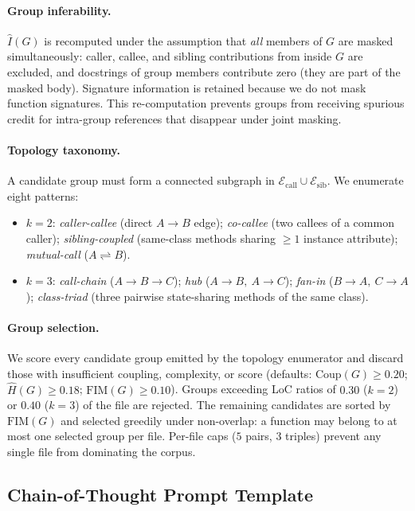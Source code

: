 \paragraph{Group inferability.}
$\hat{I}(G)$ is recomputed under the assumption that \emph{all} members of
$G$ are masked simultaneously: caller, callee, and sibling contributions
from inside $G$ are excluded, and docstrings of group members contribute
zero (they are part of the masked body). Signature information is retained
because we do not mask function signatures. This re-computation prevents
groups from receiving spurious credit for intra-group references that
disappear under joint masking.

\paragraph{Topology taxonomy.}
A candidate group must form a connected subgraph in
$\mathcal{E}_{\mathrm{call}} \cup \mathcal{E}_{\mathrm{sib}}$. We
enumerate eight patterns:
%
\begin{itemize}\setlength\itemsep{0.1em}
  \item \emph{$k=2$}: \emph{caller-callee} (direct $A\!\to\!B$ edge);
  \emph{co-callee} (two callees of a common caller); \emph{sibling-coupled}
  (same-class methods sharing $\geq 1$ instance attribute);
  \emph{mutual-call} ($A\!\rightleftharpoons\!B$).
  \item \emph{$k=3$}: \emph{call-chain} ($A\!\to\!B\!\to\!C$); \emph{hub}
  ($A\!\to\!B,\ A\!\to\!C$); \emph{fan-in} ($B\!\to\!A,\ C\!\to\!A$);
  \emph{class-triad} (three pairwise state-sharing methods of the same
  class).
\end{itemize}

\paragraph{Group selection.}
We score every candidate group emitted by the topology enumerator and
discard those with insufficient coupling, complexity, or score (defaults:
$\mathrm{Coup}(G) \ge 0.20$; $\hat{H}(G) \ge 0.18$;
$\mathrm{FIM}(G) \ge 0.10$). Groups exceeding LoC ratios of $0.30$ ($k=2$)
or $0.40$ ($k=3$) of the file are rejected. The remaining candidates are
sorted by $\mathrm{FIM}(G)$ and selected greedily under non-overlap: a
function may belong to at most one selected group per file. Per-file caps
($5$ pairs, $3$ triples) prevent any single file from dominating the
corpus.

\subsection{Chain-of-Thought Prompt Template}
\label{app:algo:cot}

